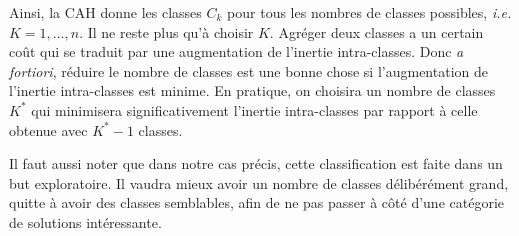 Ainsi, la CAH donne les classes $C_k$ pour tous les nombres de classes possibles, \emph{i.e.} $K = 1,\ldots, n$.
Il ne reste plus qu'à choisir $K$.
Agréger deux classes a un certain coût qui se traduit par une augmentation de l'inertie intra-classes.
Donc \emph{a fortiori}, réduire le nombre de classes est une bonne chose si l'augmentation de l'inertie intra-classes est minime.
En pratique, on choisira un nombre de classes $K^*$ qui minimisera significativement l'inertie intra-classes par rapport à celle obtenue avec $K^* -1$ classes.

Il faut aussi noter que dans notre cas précis, cette classification est faite dans un but exploratoire. 
Il vaudra mieux avoir un nombre de classes délibérément grand, quitte à avoir des classes semblables, afin de ne pas passer à côté d'une catégorie de solutions intéressante.






